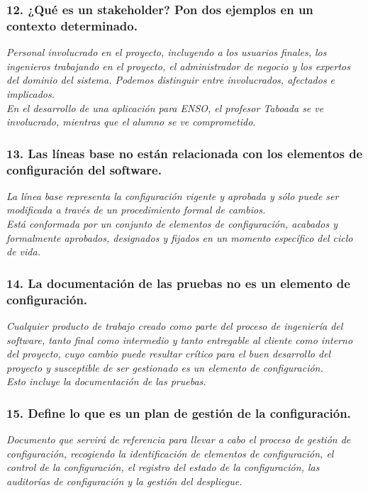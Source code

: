 \subsubsection*{12. ¿Qué es un stakeholder? Pon dos ejemplos en un contexto determinado.}
\textit{Personal involucrado en el proyecto, incluyendo a los usuarios finales, los ingenieros trabajando en el proyecto, el administrador de negocio y los expertos del dominio del sistema. Podemos distinguir entre involucrados, afectados e implicados.
    \\
    En el desarrollo de una aplicación para ENSO, el profesor Taboada se ve involucrado, mientras que el alumno se ve comprometido.
}

\subsubsection*{13. Las líneas base no están relacionada con los elementos de configuración del software.}
\textit{ La línea base representa la configuración vigente y aprobada y sólo puede ser modificada a través de un procedimiento formal de cambios.
    \\
    Está conformada por un conjunto de elementos de configuración, acabados y formalmente aprobados, designados y fijados en un momento específico del ciclo de vida.}

\subsubsection*{14. La documentación de las pruebas no es un elemento de configuración.}
\textit{Cualquier producto de trabajo creado como parte del proceso de ingeniería del software, tanto final como intermedio y tanto entregable al cliente como interno del proyecto, cuyo cambio puede resultar crítico para el buen desarrollo del proyecto y susceptible de ser gestionado es un elemento de configuración.\\
    Esto incluye la documentación de las pruebas.
}

\subsubsection*{15. Define lo que es un plan de gestión de la configuración.}
\textit{Documento que servirá de referencia para llevar a cabo el proceso de gestión de configuración, recogiendo la identificación de elementos de configuración, el control de la configuración, el registro del estado de la configuración, las auditorías de configuración y la gestión del despliegue.}

